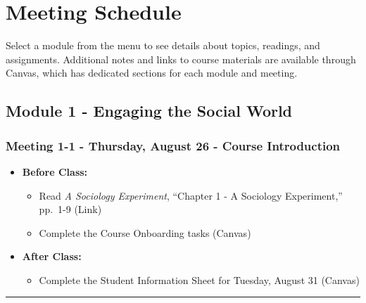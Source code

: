 \documentclass[
]{book}
\providecommand{\tightlist}{%
  \setlength{\itemsep}{0pt}\setlength{\parskip}{0pt}}
\begin{document}
\hypertarget{meeting-schedule}{%
\chapter{Meeting Schedule}\label{meeting-schedule}}

Select a module from the menu to see details about topics, readings, and assignments. Additional notes and links to course materials are available through Canvas, which has dedicated sections for each module and meeting.

\newpage

\hypertarget{module-1---engaging-the-social-world}{%
\section{Module 1 - Engaging the Social World}\label{module-1---engaging-the-social-world}}

\hypertarget{meeting-1-1---thursday-august-26---course-introduction}{%
\subsection*{Meeting 1-1 - Thursday, August 26 - Course Introduction}\label{meeting-1-1---thursday-august-26---course-introduction}}

\begin{itemize}
\tightlist
\item
  \textbf{Before Class:}

  \begin{itemize}
  \tightlist
  \item
    Read \emph{A Sociology Experiment}, ``Chapter 1 - A Sociology Experiment,'' pp.~1-9 (Link)
  \item
    Complete the Course Onboarding tasks (Canvas)
  \end{itemize}
\item
  \textbf{After Class:}

  \begin{itemize}
  \tightlist
  \item
    Complete the Student Information Sheet for Tuesday, August 31 (Canvas)
  \end{itemize}
\end{itemize}

\begin{center}\rule{0.5\linewidth}{0.5pt}\end{center}
\end{document}
